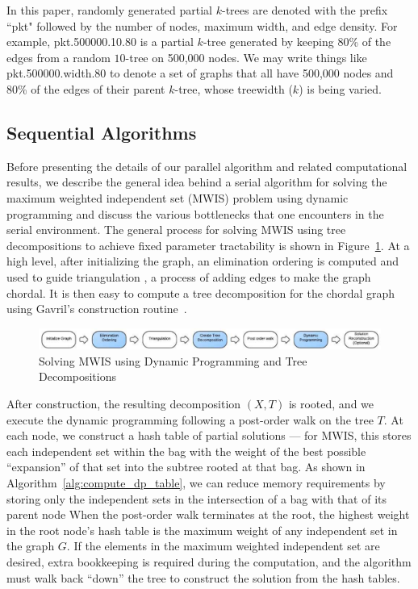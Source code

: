 \documentclass[conference]{IEEEtran}
\begin{document}
In this paper, randomly generated partial $k$-trees are
denoted with the prefix ``pkt" followed
by the number of nodes, maximum width, and edge density. For example,
pkt.500000.10.80 is a partial $k$-tree generated by keeping 80\% of the
edges from a random $10$-tree on 500,000 nodes. We may write things like
pkt.500000.width.80 to denote a set of graphs that all have 500,000 nodes
and 80\% of the edges of their parent $k$-tree, whose treewidth ($k$) is
being varied.

\subsection{Sequential Algorithms}\label{sec:seq_algorithm}

Before presenting the details of our parallel algorithm and related computational results, we describe the general idea behind a serial algorithm for solving the maximum weighted independent set (MWIS) problem using dynamic programming and discuss the various bottlenecks that one encounters in the serial environment. 
The general process for solving MWIS using tree decompositions to achieve fixed parameter tractability is shown in Figure~\ref{fig:sequential.algorithm}.  
At a high level, after initializing the graph, an elimination ordering is computed and used to
guide triangulation , a process of adding edges to make the graph chordal. 
It is then easy to compute a tree decomposition for the chordal graph using Gavril's construction routine~\cite{Gavril1974}.

\begin{figure}[!th]
\includegraphics[scale=0.60]{figures/SequentialAlgorithmDiagram.pdf}
\caption{Solving MWIS using Dynamic Programming and Tree Decompositions}
\label{fig:sequential.algorithm}
\end{figure}

After construction, the resulting decomposition $(X,T)$ is rooted, and we execute the dynamic programming
following a post-order walk on the tree $T$. At each node, we construct a hash table of partial
solutions --- for MWIS, this stores each independent set within the bag with the weight
of the best possible ``expansion'' of that set into the subtree rooted
at that bag. As shown in Algorithm~\ref{alg:compute_dp_table}, we can reduce memory requirements
by storing only the independent sets in the intersection of a bag with that of its parent node %
When the post-order walk terminates at the root, the highest weight in the root node's hash table is the
maximum weight of any independent set in the graph $G$. If the elements in the maximum
weighted independent set are desired, extra bookkeeping is required during the computation,
and the algorithm must walk back ``down'' the tree to construct the solution from the hash tables.
\end{document}
